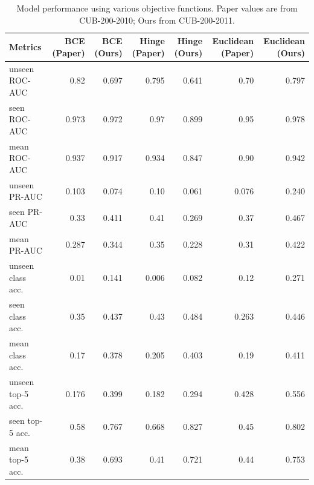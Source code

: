 
\begin{table}[t]
\centering
\scriptsize
\caption{Model performance using various objective functions. Paper values are from CUB-200-2010; Ours from CUB-200-2011.}
\label{tab:table2}
\begin{tabular}{lrrrrrr}
\toprule
Metrics & BCE (Paper) & BCE (Ours) & Hinge (Paper) & Hinge (Ours) & Euclidean (Paper) & Euclidean (Ours) \\ \midrule
unseen ROC-AUC & 0.82 & 0.697 & 0.795 & 0.641 & 0.70 & 0.797 \\
seen ROC-AUC & 0.973 & 0.972 & 0.97 & 0.899 & 0.95 & 0.978 \\
mean ROC-AUC & 0.937 & 0.917 & 0.934 & 0.847 & 0.90 & 0.942 \\
unseen PR-AUC & 0.103 & 0.074 & 0.10 & 0.061 & 0.076 & 0.240 \\
seen PR-AUC & 0.33 & 0.411 & 0.41 & 0.269 & 0.37 & 0.467 \\
mean PR-AUC & 0.287 & 0.344 & 0.35 & 0.228 & 0.31 & 0.422 \\
unseen class acc. & 0.01 & 0.141 & 0.006 & 0.082 & 0.12 & 0.271 \\
seen class acc. & 0.35 & 0.437 & 0.43 & 0.484 & 0.263 & 0.446 \\
mean class acc. & 0.17 & 0.378 & 0.205 & 0.403 & 0.19 & 0.411 \\
unseen top-5 acc. & 0.176 & 0.399 & 0.182 & 0.294 & 0.428 & 0.556 \\
seen top-5 acc. & 0.58 & 0.767 & 0.668 & 0.827 & 0.45 & 0.802 \\
mean top-5 acc. & 0.38 & 0.693 & 0.41 & 0.721 & 0.44 & 0.753 \\
 \bottomrule
\end{tabular}
\end{table}

